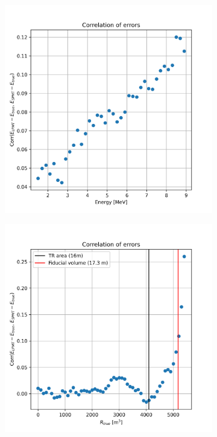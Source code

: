 \documentclass[../main.tex]{subfiles}
\begin{document}
\begin{figure}[ht]
  \centering
  \begin{subfigure}[t]{0.48\linewidth}
    \includegraphics[width=\linewidth]{images/joint_fit/E_corr.png}
  \end{subfigure}
  \hfill
  \begin{subfigure}[t]{0.48\linewidth}
    \includegraphics[width=\linewidth]{images/joint_fit/R_corr.png}

\end{subfigure}
\end{figure}
\end{document}
